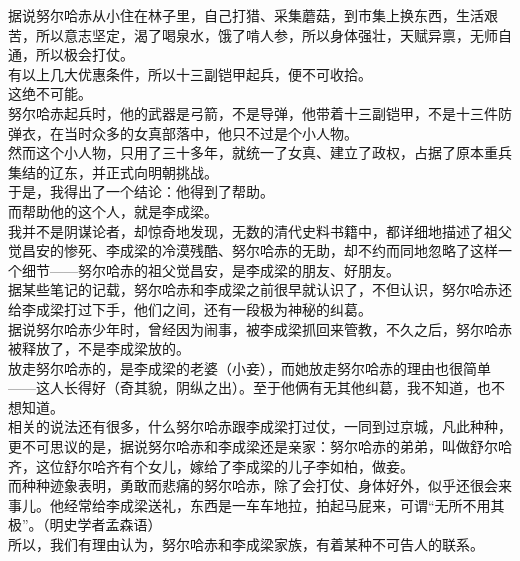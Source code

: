 \begin{multicols}{\theparacolNo}
据说努尔哈赤从小住在林子里，自己打猎、采集蘑菇，到市集上换东西，生活艰苦，所以意志坚定，渴了喝泉水，饿了啃人参，所以身体强壮，天赋异禀，无师自通，所以极会打仗。\\

有以上几大优惠条件，所以十三副铠甲起兵，便不可收拾。\\

这绝不可能。\\

努尔哈赤起兵时，他的武器是弓箭，不是导弹，他带着十三副铠甲，不是十三件防弹衣，在当时众多的女真部落中，他只不过是个小人物。\\

然而这个小人物，只用了三十多年，就统一了女真、建立了政权，占据了原本重兵集结的辽东，并正式向明朝挑战。\\

于是，我得出了一个结论：他得到了帮助。\\

而帮助他的这个人，就是李成梁。\\

我并不是阴谋论者，却惊奇地发现，无数的清代史料书籍中，都详细地描述了祖父觉昌安的惨死、李成梁的冷漠残酷、努尔哈赤的无助，却不约而同地忽略了这样一个细节——努尔哈赤的祖父觉昌安，是李成梁的朋友、好朋友。\\

据某些笔记的记载，努尔哈赤和李成梁之前很早就认识了，不但认识，努尔哈赤还给李成梁打过下手，他们之间，还有一段极为神秘的纠葛。\\

据说努尔哈赤少年时，曾经因为闹事，被李成梁抓回来管教，不久之后，努尔哈赤被释放了，不是李成梁放的。\\

放走努尔哈赤的，是李成梁的老婆（小妾），而她放走努尔哈赤的理由也很简单——这人长得好（奇其貌，阴纵之出）。至于他俩有无其他纠葛，我不知道，也不想知道。\\

相关的说法还有很多，什么努尔哈赤跟李成梁打过仗，一同到过京城，凡此种种，更不可思议的是，据说努尔哈赤和李成梁还是亲家：努尔哈赤的弟弟，叫做舒尔哈齐，这位舒尔哈齐有个女儿，嫁给了李成梁的儿子李如柏，做妾。\\

而种种迹象表明，勇敢而悲痛的努尔哈赤，除了会打仗、身体好外，似乎还很会来事儿。他经常给李成梁送礼，东西是一车车地拉，拍起马屁来，可谓“无所不用其极”。（明史学者孟森语）\\

所以，我们有理由认为，努尔哈赤和李成梁家族，有着某种不可告人的联系。\\


\end{multicols}
